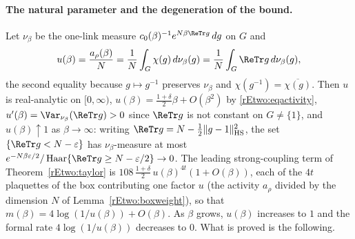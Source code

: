 \paragraph{The natural parameter and the degeneration of the bound.}
Let $\nu_\beta$ be the one-link measure $c_0(\beta)^{-1}e^{N\beta\ReTr g}
\,dg$ on $G$ and
\[
u(\beta)=\frac{a_\rho(\beta)}N=\frac1N\int_G\chi(g)\,d\nu_\beta(g)
=\frac1N\int_G\ReTr g\,d\nu_\beta(g),
\]
the second equality because $g\mapsto g^{-1}$ preserves $\nu_\beta$ and
$\chi(g^{-1})=\overline{\chi(g)}$. Then $u$ is real-analytic on $[0,
\infty)$, $u(\beta)=\tfrac{1+\delta}2\beta+O(\beta^2)$ by
\eqref{rEtwo:eqactivity}, $u'(\beta)=\Var_{\nu_\beta}(\ReTr g)>0$ since
$\ReTr g$ is not constant on $G\ne\{1\}$, and $u(\beta)\uparrow1$ as
$\beta\to\infty$: writing $\ReTr g=N-\tfrac12\|g-1\|_{\mathrm{HS}}^2$, the
set $\{\ReTr g<N-\varepsilon\}$ has $\nu_\beta$-measure at most
$e^{-N\beta\varepsilon/2}/\operatorname{Haar}\{\ReTr g\ge N-\varepsilon/2\}
\to0$. The leading strong-coupling term of Theorem~\ref{rEtwo:taylor} is
$108\,\tfrac{1+\delta}2\,u(\beta)^{4t}(1+O(\beta))$, each of the $4t$
plaquettes of the box contributing one factor $u$ (the activity $a_\rho$
divided by the dimension $N$ of Lemma~\ref{rEtwo:boxweight}), so that
$m(\beta)=4\log(1/u(\beta))+O(\beta)$. As $\beta$ grows, $u(\beta)$
increases to $1$ and the formal rate $4\log(1/u(\beta))$ decreases to $0$.
What is proved is the following.


